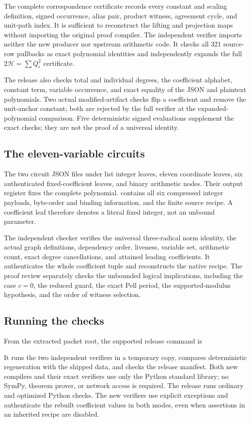 The complete correspondence certificate records every constant and
scaling definition, signed occurrence, alias pair, product witness,
agreement cycle, and unit-path index. It is sufficient to reconstruct
the lifting and projection maps without importing the original proof
compiler. The independent verifier imports neither the new producer nor
upstream arithmetic code. It checks all 321 source-row pullbacks as
exact polynomial identities and independently expands the full
$2\mathcal H=\sum Q_i^2$ certificate.

The release also checks total and individual degrees, the coefficient
alphabet, constant term, variable occurrence, and exact equality of the
JSON and plaintext polynomials. Two actual modified-artifact checks
flip a coefficient and remove the unit-anchor constant; both are
rejected by the full verifier at the expanded-polynomial comparison.
Five deterministic signed evaluations supplement the exact checks;
they are not the proof of a universal identity.

\subsection{The eleven-variable circuits}

The two circuit JSON files under  list integer leaves,
eleven coordinate leaves, six authenticated fixed-coefficient leaves,
and binary arithmetic nodes. Their output register fixes the complete
polynomial.  contains all six compressed
integer payloads, byte-order and binding information, and the finite
source recipe. A coefficient leaf therefore denotes a literal fixed
integer, not an unbound parameter.

The independent checker verifies the universal three-radical norm
identity, the actual graph definitions, dependency order, liveness,
variable set, arithmetic count, exact degree cancellations, and attained
leading coefficients. It authenticates the whole coefficient tuple and
reconstructs the native recipe. The proof review separately checks the
unbounded logical implications, including the case $c=0$, the reduced
guard, the exact Pell period, the supported-modulus hypothesis, and
the order of witness selection.

\subsection{Running the checks}

From the extracted packet root, the supported release command is
\begin{quote}
\end{quote}
It runs the two independent verifiers in a temporary copy, compares
deterministic regeneration with the shipped data, and checks the release
manifest. Both new compilers and their exact verifiers use only the
Python standard library; no SymPy, theorem prover, or network access
is required. The release runs ordinary and optimized Python checks.
The new verifiers use explicit exceptions and authenticate the rebuilt
coefficient values in both modes, even when assertions in an inherited
recipe are disabled.

